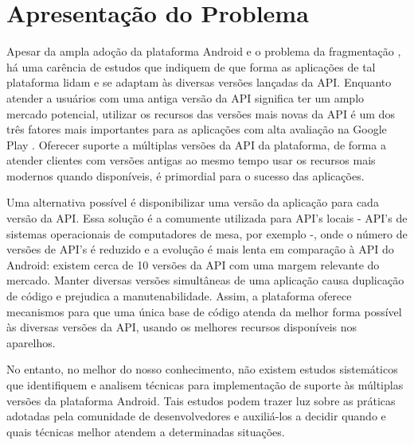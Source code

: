 \section{Apresentação do Problema} \label{sec:apresentacao-do-problema}

Apesar da ampla adoção da plataforma Android e o problema da fragmentação \cite{Park2013},
há uma carência de estudos que indiquem de que forma as aplicações de tal plataforma
lidam e se adaptam às diversas versões lançadas da API. 
Enquanto atender a usuários com uma antiga versão da API significa ter um amplo
mercado potencial, utilizar os recursos das versões mais novas da API é um dos três 
fatores mais importantes para as aplicações com alta avaliação na Google Play \cite{Tian2015}.
Oferecer suporte a múltiplas versões da API da plataforma, de forma a atender clientes
com versões antigas ao mesmo tempo usar os recursos mais modernos quando disponíveis,
é primordial para o sucesso das aplicações.

Uma alternativa possível é disponibilizar uma versão da aplicação para cada versão
da API. Essa solução é a comumente utilizada para API’s locais - API’s de sistemas
operacionais de computadores de mesa, por exemplo -, onde o número de versões de
API’s é reduzido e a evolução é mais lenta em comparação à API do Android: existem
cerca de 10 versões da API com uma margem relevante do mercado. Manter diversas
versões simultâneas de uma aplicação causa duplicação de código e prejudica a
manutenabilidade. %
Assim, a plataforma oferece mecanismos para que uma única base
de código atenda da melhor forma possível às diversas versões da API, usando os
melhores recursos disponíveis nos aparelhos.

No entanto, no melhor do nosso conhecimento, não existem estudos sistemáticos que
identifiquem e analisem técnicas para implementação de suporte às
múltiplas versões da plataforma Android. Tais estudos podem trazer luz sobre as
práticas adotadas pela comunidade de desenvolvedores e auxiliá-los a decidir
quando e quais técnicas melhor atendem a determinadas situações.

